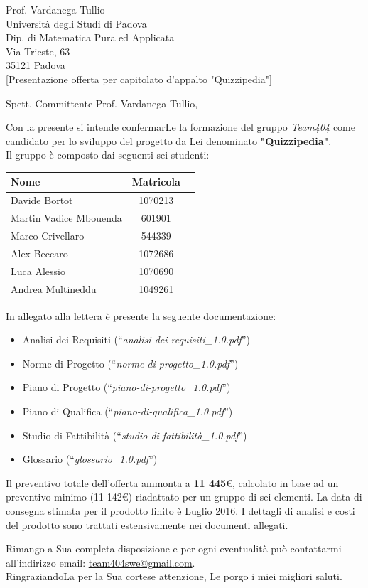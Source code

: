 \documentclass[boldsubject,shortindent,a4paper,11pt]{letteracdp}
\date{15 Marzo 2016}
\begin{document}
\begin{letter}{	Prof. Vardanega Tullio \\
				Universit\`a degli Studi di Padova \\
				Dip. di Matematica Pura ed Applicata \\
				Via Trieste, 63 \\
				35121 Padova\\
				}
[Presentazione offerta per capitolato d'appalto "Quizzipedia"]
\opening{Spett. Committente Prof. Vardanega Tullio,}
Con la presente si intende confermarLe la formazione del gruppo \emph{Team404} come candidato per lo sviluppo del progetto da Lei denominato \textbf{"Quizzipedia"}.
\\
Il gruppo è composto dai seguenti sei studenti:
		\begin{center}
			\begin{tabular}{l c l}
			\textbf{Nome} & \textbf{Matricola} \\
			\midrule
			Davide Bortot & 1070213 \\
			Martin Vadice Mbouenda & 601901\\
			Marco Crivellaro & 544339\\
			Alex Beccaro & 1072686\\
			Luca Alessio & 1070690\\
			Andrea Multineddu & 1049261\\
			\midrule
			\end{tabular}
		\end{center}
\noindent
In allegato alla lettera è presente la seguente documentazione:

\begin{itemize}
	\item Analisi dei Requisiti (``\textit{analisi-dei-requisiti\_1.0.pdf}'')
	\item Norme di Progetto (``\textit{norme-di-progetto\_1.0.pdf}'')
	\item Piano di Progetto (``\textit{piano-di-progetto\_1.0.pdf}'')
	\item Piano di Qualifica (``\textit{piano-di-qualifica\_1.0.pdf}'')
	\item Studio di Fattibilità (``\textit{studio-di-fattibilità\_1.0.pdf}'')
	\item Glossario (``\textit{glossario\_1.0.pdf}'')
\end{itemize}

\noindent
Il preventivo totale dell'offerta ammonta a \textbf{11 445}\euro, calcolato in base ad un preventivo minimo (11 142\euro) riadattato per un gruppo di sei elementi.
\newpage
La data di consegna stimata per il prodotto finito è Luglio 2016. I dettagli di analisi e costi del prodotto sono trattati estensivamente nei documenti allegati.

\closing{Rimango a Sua completa disposizione e per ogni eventualit\`a pu\`o contattarmi all'indirizzo email: \url{team404swe@gmail.com}.\\RingraziandoLa per la Sua cortese attenzione, Le porgo i miei migliori saluti.}
\end{letter}
\end{document}
